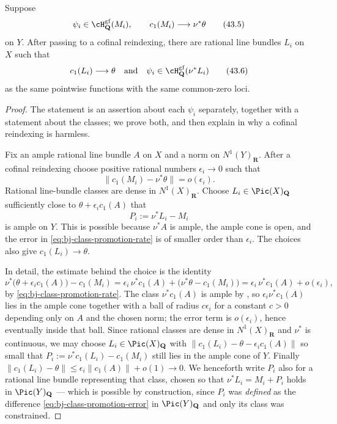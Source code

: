 \begin{lemma}\label{lem:bj-normalization-class-promotion}
Suppose
\[
       \psi_i\in\cH^{\mathrm{gf}}_{\mathbf Q}(M_i),
       \qquad
       c_1(M_i)\longrightarrow\nu^*\theta
\tag{43.5}\label{eq:bj-class-promotion-input}
\]
on $Y$.
After passing to a cofinal reindexing, there are rational line bundles
$L_i$ on $X$ such that
\[
          c_1(L_i)\longrightarrow\theta
\quad\text{and}\quad
          \psi_i\in\cH^{\mathrm{gf}}_{\mathbf Q}(\nu^*L_i)
\tag{43.6}\label{eq:bj-class-promotion-output}
\]
as the same pointwise functions with the same common-zero loci.
\end{lemma}

\begin{proof}
The statement is an assertion about each $\psi_i$ separately, together
with a statement about the classes; we prove both, and then explain in
 why a cofinal reindexing is harmless.

Fix an ample rational line bundle $A$ on $X$ and a norm on
$N^1(Y)_{\mathbf R}$.
After a cofinal reindexing choose positive rational numbers
$\epsilon_i\to0$ such that
\[
        \lVert c_1(M_i)-\nu^*\theta\rVert=o(\epsilon_i).
\tag{43.7}\label{eq:bj-class-promotion-rate}
\]
Rational line-bundle classes are dense in $N^1(X)_{\mathbf R}$.
Choose $L_i\in\Pic(X)_{\mathbf Q}$ sufficiently close to
$\theta+\epsilon_i c_1(A)$ that
\[
                         P_i:=\nu^*L_i-M_i
\tag{43.8}\label{eq:bj-class-promotion-error}
\]
is ample on $Y$.
This is possible because $\nu^*A$ is ample, the ample cone is open, and the
error in \eqref{eq:bj-class-promotion-rate} is of smaller order than
$\epsilon_i$.
The choices also give $c_1(L_i)\to\theta$.

In detail, the estimate behind the choice is the identity
\[
 \nu^*\bigl(\theta+\epsilon_ic_1(A)\bigr)-c_1(M_i)
 =\epsilon_i\,\nu^*c_1(A)
  +\bigl(\nu^*\theta-c_1(M_i)\bigr)
 =\epsilon_i\,\nu^*c_1(A)+o(\epsilon_i),
\]
by \eqref{eq:bj-class-promotion-rate}.  The class $\nu^*c_1(A)$ is ample by
, so $\epsilon_i\nu^*c_1(A)$ lies in the
ample cone together with a ball of radius $c\epsilon_i$ for a constant
$c>0$ depending only on $A$ and the chosen norm; the error term is
$o(\epsilon_i)$, hence eventually inside that ball.  Since rational
classes are dense in $N^1(X)_{\mathbf R}$ and $\nu^*$ is continuous, we
may choose $L_i\in\Pic(X)_{\mathbf Q}$ with
$\lVert c_1(L_i)-\theta-\epsilon_ic_1(A)\rVert$ so small that
$P_i:=\nu^*c_1(L_i)-c_1(M_i)$ still lies in the ample cone of $Y$.
Finally $\lVert c_1(L_i)-\theta\rVert\le\epsilon_i\lVert c_1(A)\rVert+o(1)\to0$.
We henceforth write $P_i$ also for a rational line bundle representing that
class, chosen so that $\nu^*L_i=M_i+P_i$ holds in $\Pic(Y)_{\mathbf Q}$
--- which is possible by construction, since $P_i$ was \emph{defined} as
the difference \eqref{eq:bj-class-promotion-error} in $\Pic(Y)_{\mathbf Q}$
and only its class was constrained.


\end{proof}
